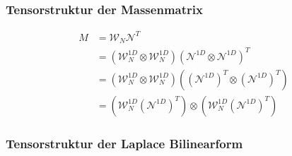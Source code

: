 \begin{frame}
\frametitle{Tensorstruktur der Massenmatrix}
\begin{framed}
\begin{equation*}
\begin{aligned}
M &= \mathcal{W}_N \mathcal{N}^T \\
&= (\mathcal{W}_N^{1D} \otimes \mathcal{W}_N^{1D})(\mathcal{N}^{1D} \otimes \mathcal{N}^{1D})^T \\
&= (\mathcal{W}_N^{1D} \otimes \mathcal{W}_N^{1D})((\mathcal{N}^{1D})^T \otimes (\mathcal{N}^{1D})^T) \\
&= (\mathcal{W}_N^{1D} (\mathcal{N}^{1D})^T) \otimes  (\mathcal{W}_N^{1D} (\mathcal{N}^{1D})^T) 
\end{aligned}
\end{equation*}
\end{framed}

\end{frame}





\begin{frame}
\frametitle{Tensorstruktur der Laplace Bilinearform}

\end{frame}